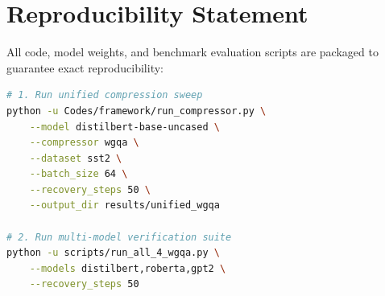 \section{Reproducibility Statement}
All code, model weights, and benchmark evaluation scripts are packaged to guarantee exact reproducibility:
\begin{lstlisting}[language=bash]
# 1. Run unified compression sweep
python -u Codes/framework/run_compressor.py \
    --model distilbert-base-uncased \
    --compressor wgqa \
    --dataset sst2 \
    --batch_size 64 \
    --recovery_steps 50 \
    --output_dir results/unified_wgqa

# 2. Run multi-model verification suite
python -u scripts/run_all_4_wgqa.py \
    --models distilbert,roberta,gpt2 \
    --recovery_steps 50
\end{lstlisting}

